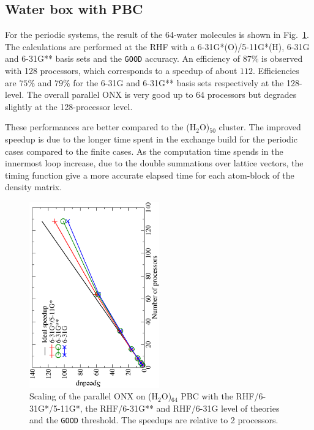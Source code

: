 \documentclass[twocolumn,showkeys,showpacs,preprintnumbers,amsmath,amssymb]{revtex4}
\begin{document}
\subsection{Water box with PBC}
 For the periodic systems, the result of the 64-water molecules is shown
 in Fig.~\ref{fig:h2o_pbc_64}. The calculations are performed at the
 RHF with a 6-31G*(O)/5-11G*(H), 6-31G and 6-31G** basis sets and the {\tt GOOD} accuracy. 
 An efficiency of $87\%$ is observed with 128 processors, which corresponds to
 a speedup of about $112$. Efficiencies are $75\%$ and $79\%$ for the 6-31G and 6-31G** 
 basis sets respectively at the 128-level. The overall parallel ONX is very
 good up to 64 processors but degrades slightly at the 128-processor level.

 These performances are better compared to the (H$_2$O)$_{50}$ cluster. The 
 improved speedup is due to the longer time spent in the
 exchange build for the periodic cases compared 
 to the finite cases. As the computation time spends in the innermost loop 
 increase, due to the double summations over lattice vectors,
 the timing function give a more accurate elapsed time for each 
 atom-block of the density matrix.\\

\begin{figure}[p]
  \centering
  \caption{\protect
    Scaling of the parallel ONX on (H$_2$O)$_{64}$ PBC with the RHF/6-31G*/5-11G*,
    the RHF/6-31G** and RHF/6-31G level of theories and the {\tt GOOD} threshold. 
    The speedups are relative to 2 processors.
  }\label{fig:h2o_pbc_64}
  \begin{center}
    \includegraphics[angle=-90,width=0.5\textwidth]{h2o_pbc_64}
  \end{center}
\end{figure}
\end{document}
